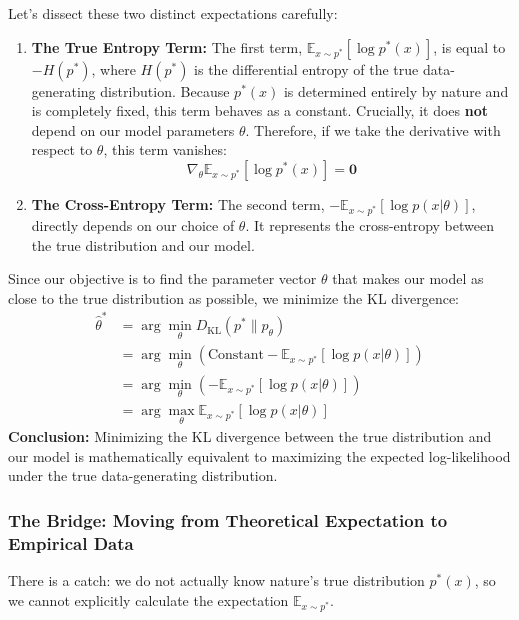 \documentclass{article}
\begin{document}
Let's dissect these two distinct expectations carefully:
\begin{enumerate}
    \item \textbf{The True Entropy Term:} The first term, $\mathbb{E}_{x \sim p^*}\left[\log p^*(x)\right]$, is equal to $-H(p^*)$, where $H(p^*)$ is the differential entropy of the true data-generating distribution. Because $p^*(x)$ is determined entirely by nature and is completely fixed, this term behaves as a constant. Crucially, it does \textbf{not} depend on our model parameters $\theta$. Therefore, if we take the derivative with respect to $\theta$, this term vanishes:
    \begin{equation}
    \nabla_\theta \mathbb{E}_{x \sim p^*}\left[\log p^*(x)\right] = \mathbf{0}
    \end{equation}
    \item \textbf{The Cross-Entropy Term:} The second term, $-\mathbb{E}_{x \sim p^*}\left[\log p(x|\theta)\right]$, directly depends on our choice of $\theta$. It represents the cross-entropy between the true distribution and our model.
\end{enumerate}

Since our objective is to find the parameter vector $\theta$ that makes our model as close to the true distribution as possible, we minimize the KL divergence:
\begin{align*}
\hat{\theta}^* &= \arg\min_{\theta} D_{\text{KL}}(p^* \parallel p_\theta) \\
&= \arg\min_{\theta} \left( \text{Constant} - \mathbb{E}_{x \sim p^*}\left[\log p(x|\theta)\right] \right) \\
&= \arg\min_{\theta} \left( - \mathbb{E}_{x \sim p^*}\left[\log p(x|\theta)\right] \right) \\
&= \arg\max_{\theta} \mathbb{E}_{x \sim p^*}\left[\log p(x|\theta)\right]
\end{align*}
\textbf{Conclusion:} Minimizing the KL divergence between the true distribution and our model is mathematically equivalent to maximizing the expected log-likelihood under the true data-generating distribution.

\subsubsection{The Bridge: Moving from Theoretical Expectation to Empirical Data}
There is a catch: we do not actually know nature's true distribution $p^*(x)$, so we cannot explicitly calculate the expectation $\mathbb{E}_{x \sim p^*}$. 
\end{document}
